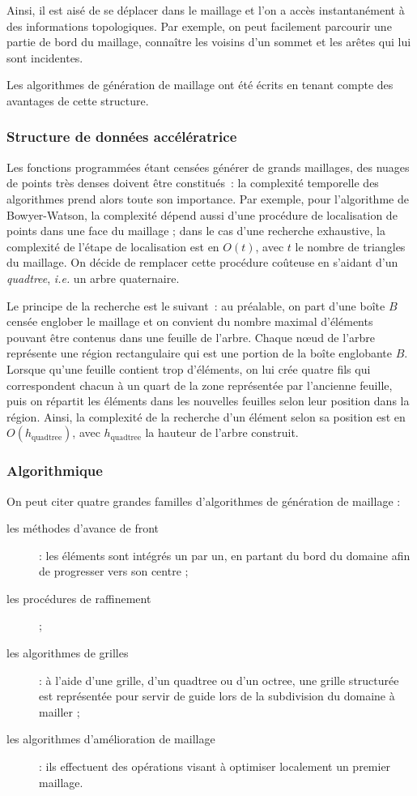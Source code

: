 \documentclass[12pt,a4paper]{report}
\begin{document}
Ainsi, il est aisé de se déplacer dans le maillage et l'on a accès instantanément à des informations topologiques. Par exemple, on peut facilement parcourir une partie de bord du maillage, connaître les voisins d'un sommet et les arêtes qui lui sont incidentes.

Les algorithmes de génération de maillage ont été écrits en tenant compte des avantages de cette structure.



\subsubsection{Structure de données accélératrice}

Les fonctions programmées étant censées générer de \og grands \fg{} maillages, des nuages de points très denses doivent être constitués~: la  complexité temporelle des algorithmes prend alors toute son importance. Par exemple, pour l'algorithme de Bowyer-Watson, la complexité dépend aussi d'une procédure de localisation de points dans une face du maillage ; dans le cas d'une recherche exhaustive, la complexité de l'étape de localisation est en $O(t)$, avec $t$ le nombre de triangles du maillage. On décide de remplacer cette procédure coûteuse en s'aidant d'un \emph{quadtree}, \emph{i.e.} un arbre quaternaire.

Le principe de la recherche est le suivant~: au préalable, on part d'une boîte $B$ censée englober le maillage et on convient du nombre maximal d'éléments pouvant être contenus dans une feuille de l'arbre. Chaque n\oe{}ud de l'arbre représente une région rectangulaire qui est une portion de la boîte englobante $B$. Lorsque qu'une feuille contient trop d'éléments, on lui crée quatre fils qui correspondent chacun à un quart de la zone représentée par l'ancienne feuille, puis on répartit les éléments dans les nouvelles feuilles selon leur position dans la région. Ainsi, la complexité de la recherche d'un élément selon sa position est en $O(h_{\text{quadtree}})$, avec $h_{\text{quadtree}}$ la hauteur de l'arbre construit.

\subsubsection{Algorithmique}

On peut citer quatre grandes familles d'algorithmes de génération de maillage :
\begin{description}
\item[les méthodes d'avance de front] : les éléments sont intégrés un par un, en partant du bord du domaine afin de progresser vers son centre ;
\item[les procédures de raffinement] ;
\item[les algorithmes de grilles] : à l'aide d'une grille, d'un quadtree ou d'un octree, une grille structurée est représentée pour servir de guide lors de la subdivision du domaine à mailler ;
\item[les algorithmes d'amélioration de maillage] : ils effectuent des opérations visant à optimiser localement un premier maillage.
\end{description}
\end{document}
